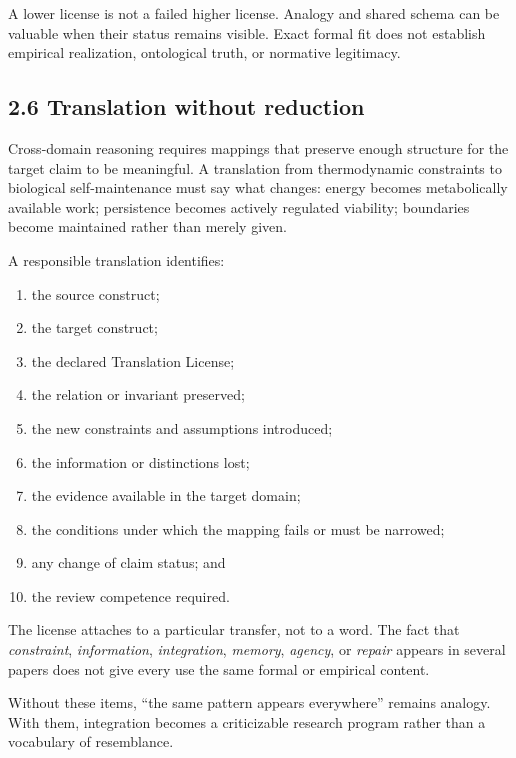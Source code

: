 \documentclass[
  11pt,
]{article}
\providecommand{\tightlist}{%
  \setlength{\itemsep}{0pt}\setlength{\parskip}{0pt}}
\begin{document}
A lower license is not a failed higher license. Analogy and shared
schema can be valuable when their status remains visible. Exact formal
fit does not establish empirical realization, ontological truth, or
normative legitimacy.

\subsection{2.6 Translation without
reduction}\label{translation-without-reduction}

Cross-domain reasoning requires mappings that preserve enough structure
for the target claim to be meaningful. A translation from thermodynamic
constraints to biological self-maintenance must say what changes: energy
becomes metabolically available work; persistence becomes actively
regulated viability; boundaries become maintained rather than merely
given.

A responsible translation identifies:

\begin{enumerate}
\def\labelenumi{\arabic{enumi}.}
\tightlist
\item
  the source construct;
\item
  the target construct;
\item
  the declared Translation License;
\item
  the relation or invariant preserved;
\item
  the new constraints and assumptions introduced;
\item
  the information or distinctions lost;
\item
  the evidence available in the target domain;
\item
  the conditions under which the mapping fails or must be narrowed;
\item
  any change of claim status; and
\item
  the review competence required.
\end{enumerate}

The license attaches to a particular transfer, not to a word. The fact
that \emph{constraint}, \emph{information}, \emph{integration},
\emph{memory}, \emph{agency}, or \emph{repair} appears in several papers
does not give every use the same formal or empirical content.

Without these items, ``the same pattern appears everywhere'' remains
analogy. With them, integration becomes a criticizable research program
rather than a vocabulary of resemblance.
\end{document}
